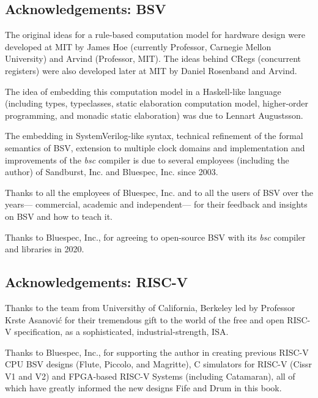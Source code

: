 \vspace*{1.5cm}

\noindent
\subsection*{Acknowledgements: BSV}

The original ideas for a rule-based computation model for hardware
design were developed at MIT by James Hoe (currently Professor,
Carnegie Mellon University) and Arvind (Professor, MIT).  The ideas
behind CRegs (concurrent registers) were also developed later at MIT
by Daniel Rosenband and Arvind.

The idea of embedding this computation model in a Haskell-like
language (including types, typeclasses, static elaboration computation
model, higher-order programming, and monadic static elaboration) was
due to Lennart Augustsson.

The embedding in SystemVerilog-like syntax, technical refinement of
the formal semantics of BSV, extension to multiple clock domains and
implementation and improvements of the \emph{bsc} compiler is due to
several employees (including the author) of Sandburst, Inc. and
Bluespec, Inc. since 2003.

Thanks to all the employees of Bluespec, Inc. and to all the users of
BSV over the years--- commercial, academic and independent--- for
their feedback and insights on BSV and how to teach it.

Thanks to Bluespec, Inc., for agreeing to open-source BSV with its
\emph{bsc} compiler and libraries in 2020.

\noindent
\subsection*{Acknowledgements: RISC-V}

Thanks to the team from Universithy of California, Berkeley led by
Professor Krste {Asanovi\'c} for their tremendous gift to the world of
the free and open RISC-V specification, as a sophisticated,
industrial-strength, ISA.

Thanks to Bluespec, Inc., for supporting the author in creating
previous RISC-V CPU BSV designs (Flute, Piccolo, and Magritte), C
simulators for RISC-V (Cissr V1 and V2) and FPGA-based RISC-V Systems
(including Catamaran), all of which have greatly informed the new
designs Fife and Drum in this book.


